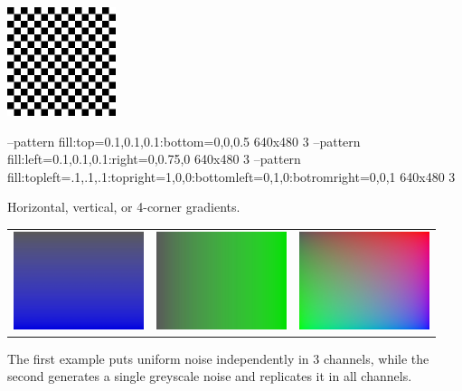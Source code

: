 \spc \includegraphics[width=1.25in]{figures/checker.jpg} 
\apiend

\vspace{10pt}
\begin{tinycode}
--pattern fill:top=0.1,0.1,0.1:bottom=0,0,0.5 640x480 3
--pattern fill:left=0.1,0.1,0.1:right=0,0.75,0 640x480 3
--pattern fill:topleft=.1,.1,.1:topright=1,0,0:bottomleft=0,1,0:botromright=0,0,1 640x480 3
\end{tinycode}

\noindent Horizontal, vertical, or 4-corner gradients.

\noindent \begin{tabular}{lll}
\includegraphics[width=1.5in]{figures/gradient.jpg} &
 \includegraphics[width=1.5in]{figures/gradienth.jpg} &
 \includegraphics[width=1.5in]{figures/gradient4.jpg}
\end{tabular}

\vspace{10pt}
The first example puts uniform noise independently in 3 channels, while the
second generates a single greyscale noise and replicates it in all channels.

